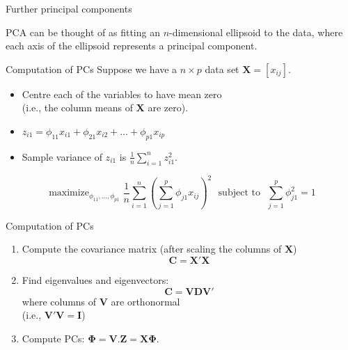 \documentclass[14pt]{beamer}
\begin{document}



\begin{frame}{Further principal components}
\pause\vspace*{5.5cm}

\begin{block}{}
PCA can be thought of as fitting an $n$-dimensional ellipsoid to the data, where each axis of the ellipsoid represents a principal component.
\end{block}
\end{frame}

\begin{frame}{Computation of PCs}
Suppose we have a $n\times p$ data set $\bm{X} = [x_{ij}]$. 
\begin{itemize}
\item Centre each of the variables to have mean zero\\ (i.e., the
column means of $\bm{X}$ are zero).
\item  $z_{i1} = \phi_{11}x_{i1} + \phi_{21} x_{i2} + \dots + \phi_{p1} x_{ip}$
\item Sample variance of $z_{i1}$ is $\displaystyle\frac1n\sum_{i=1}^n z_{i1}^2$.
\end{itemize}\pause
\begin{block}{}\vspace*{-0.5cm}
\[
\mathop{\text{maximize}}_{\phi_{11},\dots,\phi_{p1}} \frac{1}{n}\sum_{i=1}^n 
\left(\sum_{j=1}^p \phi_{j1}x_{ij}\right)^{\!\!\!2} \text{~~subject to~~}
\sum_{j=1}^p \phi^2_{j1} = 1
\]
\end{block}


\end{frame}

\begin{frame}{Computation of PCs}

\begin{enumerate}
\item Compute the covariance matrix (after scaling the columns of $\bm{X}$)
$$\bm{C} = \bm{X}'\bm{X}$$

\item Find eigenvalues and eigenvectors:
$$\bm{C}=\bm{V}\bm{D}\bm{V}'$$ 
where columns of $\bm{V}$ are orthonormal\\ (i.e., $\bm{V}'\bm{V}=\bm{I}$)

\item Compute PCs: $\bm{\Phi} = \bm{V}$.\quad $\bm{Z} = \bm{X}\bm{\Phi}$.

\end{enumerate}
\end{frame}
\end{document}
